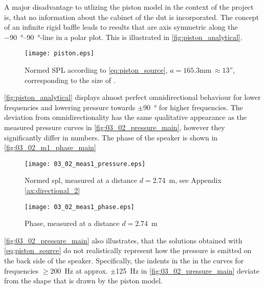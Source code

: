 A major disadvantage to utlizing the piston model in the context of the project is, that no information about the cabinet of the \gls{dut} is incorporated. The concept of an infinite rigid baffle leads to results that are axis symmetric along the \SIrange{-90}{90}{\degree}-line in a polar plot. This is illustrated in \autoref{fig:piston_analytical}.
\begin{figure}[H]
	\centering
	\texttt{[image: piston.eps]}
	\caption{Normed SPL according to \autoref{eq:piston_source}, $a=165.3$\si{\milli\meter}$\,\approx 13$'', corresponding to the size of \citep{seas33}.}
		\label{fig:piston_analytical}
\end{figure}
\autoref{fig:piston_analytical} displays almost perfect omnidirectional behaviour for lower frequencies and lowering pressure towards $\pm$\SI{90}{\degree} for higher frequencies. The deviation from omnidirectionality has the same qualitative appearance as the measured pressure curves in \autoref{fig:03_02_pressure_main}, however they significantly differ in numbers. The phase of the speaker is shown in  \autoref{fig:03_02_m1_phase_main}  
\begin{figure}[htbp]
	\centering
	\texttt{[image: 03\_02\_meas1\_pressure.eps]}
	\caption{Normed \gls{spl}, measured at a distance \(d=\)\SI{2.74}{\meter}, see Appendix \ref{ax:directional_2}}
		\label{fig:03_02_pressure_main}
\end{figure}

\begin{figure}[htbp]
	\centering
	\texttt{[image: 03\_02\_meas1\_phase.eps]}
	\caption{Phase, measured at a distance \(d=\)\SI{2.74}{\meter}}
		\label{fig:03_02_m1_phase_main}
\end{figure}

\autoref{fig:03_02_pressure_main} also illustrates, that the solutions obtained with \autoref{eq:piston_source} do not realistically represent how the pressure is emitted on the back side of the speaker. Specifically, the indents in the in the curves for frequencies $\ge$\SI{200}{\hertz} at approx. $\pm$\SI{125}{\hertz} in \autoref{fig:03_02_pressure_main} deviate from the shape that is drawn by the piston model. 


    
